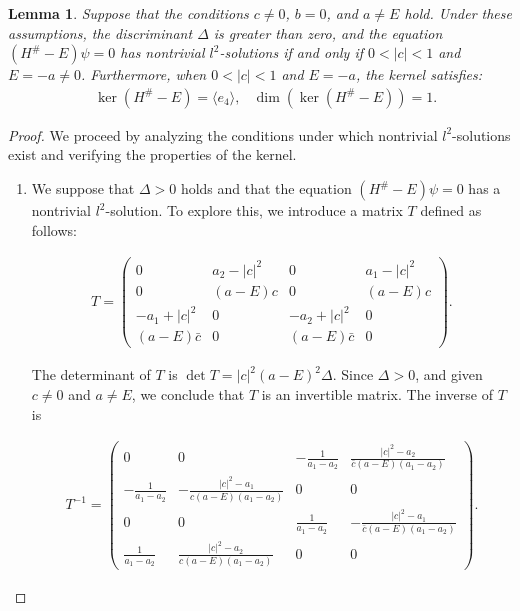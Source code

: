 \documentclass{amsart}
\newtheorem{lem}[thm]{Lemma}
\theoremstyle{definition}
\theoremstyle{remark}
\begin{document}
\begin{lem}\label{lem:6.6}
Suppose that the conditions \(c \neq 0\), \(b = 0\), and \(a \neq E\) hold. Under these assumptions, the discriminant \(\Delta\) is greater than zero, and the equation \((H^\# - E)\psi = 0\) has nontrivial \(l^2\)-solutions if and only if \(0 < |c| < 1\) and \(E = -a \neq 0\). Furthermore, when \(0 < |c| < 1\) and \(E = -a\), the kernel satisfies:
\begin{align*}
&\ker(H^\# - E) = \langle e_4 \rangle, &\dim(\ker(H^\# - E)) = 1.
\end{align*}
\end{lem}

\begin{proof}
We proceed by analyzing the conditions under which nontrivial \(l^2\)-solutions exist and verifying the properties of the kernel.

\begin{enumerate}
    \item We suppose that \(\Delta > 0\) holds and that the equation \((H^\# - E)\psi = 0\) has a nontrivial \(l^2\)-solution. To explore this, we introduce a matrix \(T\) defined as follows:

    \begin{align*}
    T = \begin{pmatrix}
    0 & a_2 - |c|^2 & 0 & a_1 - |c|^2 \\
    0 & (a - E)c & 0 & (a - E)c \\
    -a_1 + |c|^2 & 0 & -a_2 + |c|^2 & 0 \\
    (a - E)\bar{c} & 0 & (a - E)\bar{c} & 0
    \end{pmatrix}.
    \end{align*}

    The determinant of \(T\) is \(\det T = |c|^2 (a - E)^2 \Delta\). Since \(\Delta > 0\), and given \(c \neq 0\) and \(a \neq E\), we conclude that \(T\) is an invertible matrix. The inverse of $T$ is

    \begin{align*}
    T^{-1} = \begin{pmatrix}
    0 & 0 & -\frac{1}{a_1 - a_2} & \frac{|c|^2 - a_2}{\bar{c} (a - E) (a_1 - a_2)} \\
    -\frac{1}{a_1 - a_2} & -\frac{|c|^2 - a_1}{c (a - E) (a_1 - a_2)} & 0 & 0 \\
    0 & 0 & \frac{1}{a_1 - a_2} & -\frac{|c|^2 - a_1}{\bar{c} (a - E) (a_1 - a_2)} \\
    \frac{1}{a_1 - a_2} & \frac{|c|^2 - a_2}{c (a - E) (a_1 - a_2)} & 0 & 0
    \end{pmatrix}.
    \end{align*}


\end{enumerate}
\end{proof}
\end{document}
